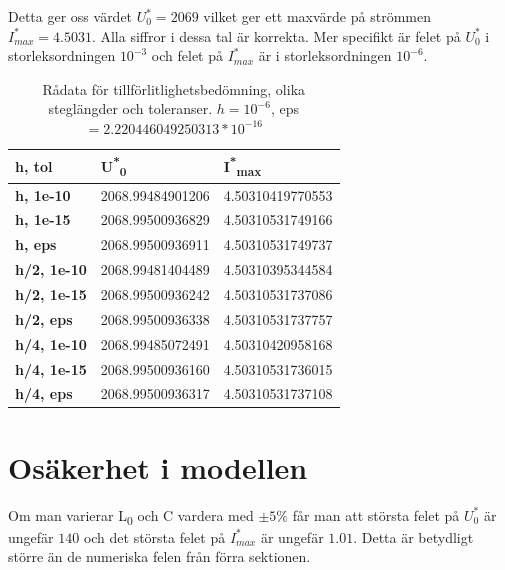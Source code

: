 \documentclass[a4paper, titlepage, 11pt]{article}
\begin{document}
Detta ger oss värdet $U_0^* = 2069$ vilket ger ett maxvärde på strömmen $I_{max}^* = 4.5031$. Alla siffror i dessa tal är korrekta. Mer specifikt är felet på $U_0^*$ i storleksordningen $10^{-3}$ och felet på $I_{max}^*$ är i storleksordningen $10^{-6}$.

\begin{table}[H]
\caption{Rådata för tillförlitlighetsbedömning, olika steglängder och toleranser. $h = 10^{-6}$, eps $= 2.220446049250313*10^{-16}$ }
\begin{center}
\begin{tabular}{l|ll}
\hline
{\color[HTML]{000000} \textbf{h, tol}}     & {\color[HTML]{000000} \textbf{U\textsuperscript{*}\textsubscript{0}}}     & {\color[HTML]{000000} \textbf{I\textsuperscript{*}\textsubscript{max}}}  \\ \hline
{\color[HTML]{000000} \textbf{h, 1e-10}}   & {\color[HTML]{000000} 2068.99484901206} & {\color[HTML]{000000} 4.50310419770553} \\
{\color[HTML]{000000} \textbf{h, 1e-15}}   & {\color[HTML]{000000} 2068.99500936829} & {\color[HTML]{000000} 4.50310531749166} \\
{\color[HTML]{000000} \textbf{h, eps}}     & {\color[HTML]{000000} 2068.99500936911} & {\color[HTML]{000000} 4.50310531749737} \\ \hline
{\color[HTML]{000000} \textbf{h/2, 1e-10}} & {\color[HTML]{000000} 2068.99481404489} & {\color[HTML]{000000} 4.50310395344584} \\
{\color[HTML]{000000} \textbf{h/2, 1e-15}} & {\color[HTML]{000000} 2068.99500936242} & {\color[HTML]{000000} 4.50310531737086} \\
{\color[HTML]{000000} \textbf{h/2, eps}}   & {\color[HTML]{000000} 2068.99500936338} & {\color[HTML]{000000} 4.50310531737757} \\ \hline
{\color[HTML]{000000} \textbf{h/4, 1e-10}} & {\color[HTML]{000000} 2068.99485072491} & {\color[HTML]{000000} 4.50310420958168} \\
{\color[HTML]{000000} \textbf{h/4, 1e-15}} & {\color[HTML]{000000} 2068.99500936160} & {\color[HTML]{000000} 4.50310531736015} \\
{\color[HTML]{000000} \textbf{h/4, eps}}   & {\color[HTML]{000000} 2068.99500936317} & {\color[HTML]{000000} 4.50310531737108}
\end{tabular}
\end{center}
\end{table}


\section{Osäkerhet i modellen}
Om man varierar L\textsubscript{0} och C vardera med $\pm5\%$ får man att största felet på $U_0^*$ är ungefär $140$ och det största felet på $I_{max}^*$ är ungefär $1.01$. Detta är betydligt större än de numeriska felen från förra sektionen.
\end{document}
